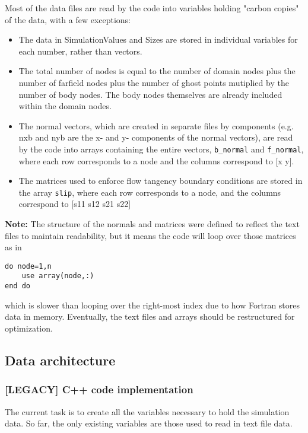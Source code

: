 \documentclass[12pt]{article}
\begin{document}
        Most of the data files are read by the code into variables holding "carbon copies" of the data, with a few exceptions:
        \begin{itemize}
            \item The data in SimulationValues and Sizes are stored in individual variables for each number, rather than vectors.
            \item The total number of nodes is equal to the number of domain nodes plus the number of farfield nodes plus the number of ghost points mutiplied by the number of body nodes. The body nodes themselves are already included within the domain nodes.
            \item The normal vectors, which are created in separate files by components (e.g. nxb and nyb are the x- and y- components of the normal vectors), are read by the code into arrays containing the entire vectors, \texttt{b\_normal} and \texttt{f\_normal}, where each row corresponds to a node and the columns correspond to [x y].
            \item The matrices used to enforce flow tangency boundary conditions are stored in the array \texttt{slip}, where each row corresponds to a node, and the columns correspond to [s11 s12 s21 s22]
        \end{itemize}
        \textbf{Note:} The structure of the normals and matrices were defined to reflect the text files to maintain readability, but it means the code will loop over those matrices as in
        \begin{verbatim}
do node=1,n
    use array(node,:)
end do
        \end{verbatim}
        which is slower than looping over the right-most index due to how Fortran stores data in memory. Eventually, the text files and arrays should be restructured for optimization.

    \subsection{Data architecture}
    \subsubsection*{[LEGACY] C++ code implementation}
        The current task is to create all the variables necessary to hold the simulation data. So far, the only existing variables are those used to read in text file data.
            
\end{document}
